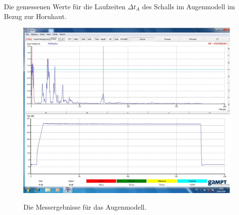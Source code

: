 \begin{table}
	\centering
	\caption{Die gemessenen Werte für die Laufzeiten $\Delta t_A$ des Schalls im Augenmodell im Bezug zur Hornhaut.}
	
	\label{tab:Auge}
\end{table}

\begin{figure}
	\centering
	\caption{Die Messergebnisse für das Augenmodell.}
	\includegraphics[width=\linewidth-70pt,height=\textheight-70pt,keepaspectratio]{content/images/AUGE.jpg}
	\label{fig:Auge}
\end{figure}